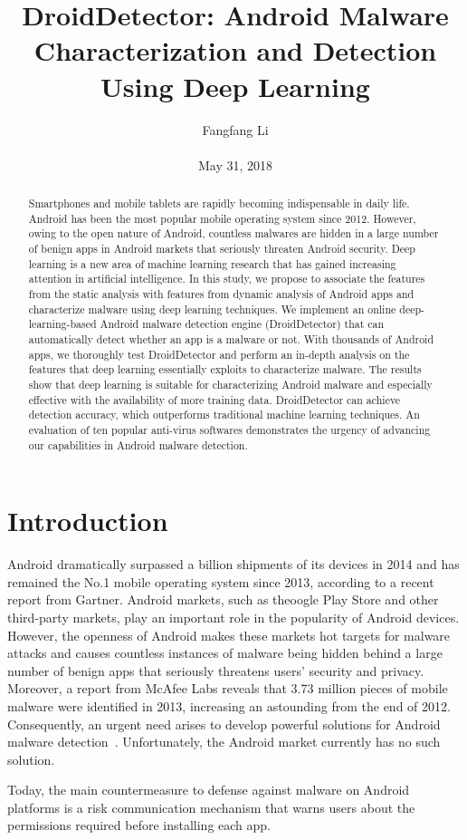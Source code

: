 \documentclass[10pt,twocolumn,letterpaper]{article}
\title{\textbf{DroidDetector: Android Malware Characterization and Detection Using Deep Learning}}
\author{Fangfang Li\\\\May 31, 2018}
\begin{document}
\maketitle
\par

\begin{abstract}
  Smartphones and mobile tablets are rapidly becoming indispensable in daily life. Android has been the most popular mobile operating system since 2012. However, owing to the open nature of Android, countless malwares are hidden in a large number of benign apps in Android markets that seriously threaten Android security. Deep learning is a new area of machine learning research that has gained increasing attention in artificial intelligence. In this study, we propose to associate the features from the static analysis with features from dynamic analysis of Android apps and characterize malware using deep learning techniques. We implement an online deep-learning-based Android malware detection engine (DroidDetector) that can automatically detect whether an app is a malware or not. With thousands of Android apps, we thoroughly test DroidDetector and perform an in-depth analysis on the features that deep learning essentially exploits to characterize malware. The results show that deep learning is suitable for characterizing Android malware and especially effective with the availability of more training data. DroidDetector can achieve detection accuracy, which outperforms traditional machine learning techniques. An evaluation of ten popular anti-virus softwares demonstrates the urgency of advancing our capabilities in Android malware detection.
\end{abstract}
\section{Introduction}

Android dramatically surpassed a billion shipments of its devices in 2014 and has remained the No.1 mobile operating system since 2013, according to a recent report from Gartner. Android markets, such as theoogle Play Store and other third-party markets, play an important role in the popularity of Android devices. However, the openness of Android makes these markets hot targets for malware attacks and causes countless instances of malware being hidden behind a large number of benign apps that seriously threatens users’ security and privacy. Moreover, a report from McAfee Labs reveals that 3.73 million pieces of mobile malware were identified in 2013, increasing an astounding from the end of 2012. Consequently, an urgent need arises to develop powerful solutions for Android malware detection~\cite{Katyal_2017_CVPR_Workshops}. Unfortunately, the Android market currently has no such solution.
\par
Today, the main countermeasure to defense against malware on Android platforms is a risk communication mechanism that warns users about the permissions required before installing each app.
\end{document}
